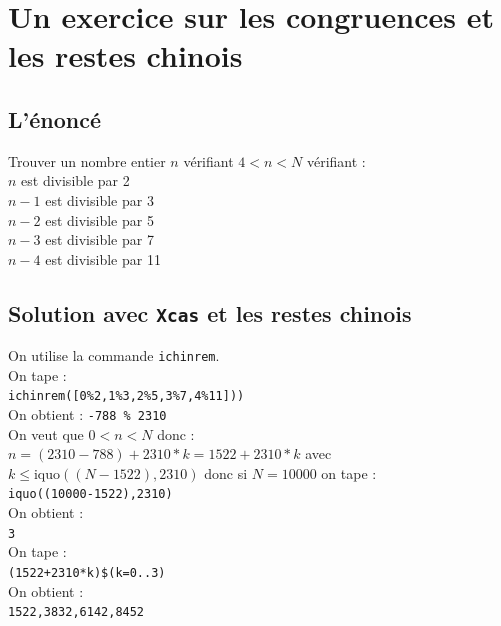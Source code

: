 \documentclass[a4paper,11pt]{book}
\begin{document}
\section{Un exercice sur les congruences et les restes chinois}
\subsection{L'\'enonc\'e}
Trouver un nombre entier $n$ v\'erifiant $4<n<N$ v\'erifiant :\\
$n$ est divisible par 2\\
$n-1$ est divisible par 3\\
$n-2$ est divisible par 5\\ 
$n-3$ est divisible par 7\\
$n-4$ est divisible par 11

\subsection{Solution avec {\tt Xcas} et les restes chinois}
On utilise la commande {\tt ichinrem}.\\
On tape :\\
{\tt ichinrem([0\%2,1\%3,2\%5,3\%7,4\%11]))}\\
On obtient :
{\tt -788 \% 2310}\\
On veut que $0<n<N$ donc  :\\
$n=(2310-788)+2310*k=1522+2310*k$ avec $k\leq \mbox{iquo}((N-1522),2310)$
donc si $N=10000$ on tape :\\
{\tt iquo((10000-1522),2310)}\\
On obtient :\\
{\tt 3}\\
On tape :\\
{\tt (1522+2310*k)\$(k=0..3)}\\
On obtient :\\
{\tt 1522,3832,6142,8452}
\end{document}
